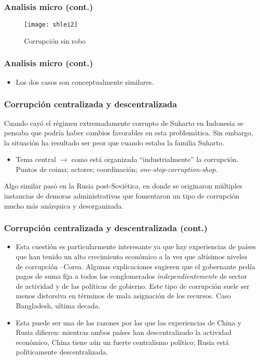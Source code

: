\documentclass[handout,final,xcolor=dvipsnames]{beamer}
\begin{document}
\begin{frame}\frametitle{Analisis micro (cont.)}
  \begin{figure}[htbp]
    \centering \vspace{-2cm}
    \texttt{[image: shlei2]}
    \caption{Corrupción sin robo}
  \end{figure}
\end{frame}


\begin{frame}\frametitle{Analisis micro (cont.)}
\begin{itemize}\itemsep 10pt
\item Los dos casos son conceptualmente similares. 
\end{itemize}
\end{frame}


\begin{frame}\frametitle{Corrupción centralizada y descentralizada}
\begin{block}{}
Cuando cayó el régimen extremadamente corrupto de Suharto en Indonesia
se pensaba que podría haber cambios favorables en esta
problemática. Sin embargo, la situación ha resultado ser peor que
cuando estaba la familia Suharto. 
\end{block}
\begin{itemize}\itemsep 10pt
\item Tema central $\longrightarrow$ como está organizada
  ``industrialmente'' la corrupción. Puntos de coima; actores;
  coordinación; \textit{one-stop-corruption-shop}.
\end{itemize}
\begin{block}{}
Algo similar pasó en la Rusia post-Soviética, en donde se originaron
múltiples instancias de demoras administrativas que fomentaron un tipo
de corrupción mucho más anárquica y desorganizada. 
\end{block}
\end{frame}


\begin{frame}\frametitle{Corrupción centralizada y descentralizada (cont.)}
\begin{itemize}\itemsep 10pt
\item Esta cuestión es particularmente interesante ya que hay
  experiencias de países que han tenido un alto crecimiento económico
  a la vez que altísimos niveles de corrupción --Corea. Algunas
  explicaciones sugieren que el gobernante pedía pagos de suma fija a
  todos los conglomerados \textit{independientemente} de sector de
  actividad y de las políticas de gobierno. Este tipo de corrupción
  suele ser menos distorsiva en términos de mala asignación de los
  recursos. Caso Bangladesh, ultima decada. 
\item Esta puede ser una de las razones por
  las que las experiencias de China y Rusia difieren: mientras ambos
  países han descentralizado la actividad económico, China tiene aún
  un fuerte centralismo político; Rusia está políticamente
  descentralizada.  
\end{itemize}
\end{frame}
\end{document}
